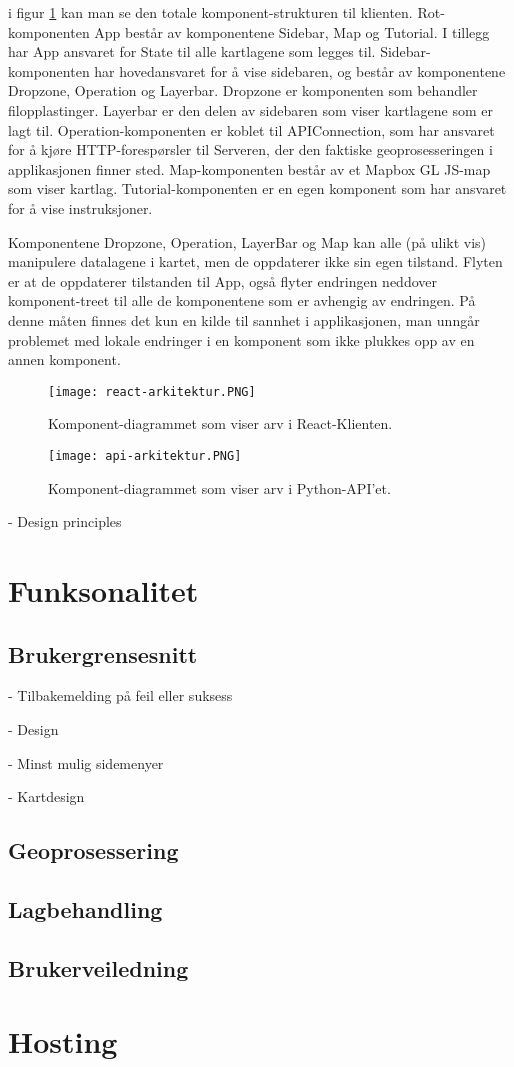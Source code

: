 i figur \ref{fig:react-arkitektur} kan man se den totale komponent-strukturen til klienten. Rot-komponenten App består av komponentene Sidebar, Map og Tutorial. I tillegg har App ansvaret for State til alle kartlagene som legges til. Sidebar-komponenten har hovedansvaret for å vise sidebaren, og består av komponentene Dropzone, Operation og Layerbar. Dropzone er komponenten som behandler filopplastinger. Layerbar er den delen av sidebaren som viser kartlagene som er lagt til. Operation-komponenten er koblet til APIConnection, som har ansvaret for å kjøre HTTP-forespørsler til Serveren, der den faktiske geoprosesseringen i applikasjonen finner sted. Map-komponenten består av et Mapbox GL JS-map som viser kartlag. Tutorial-komponenten er en egen komponent som har ansvaret for å vise instruksjoner. 

Komponentene Dropzone, Operation, LayerBar og Map kan alle (på ulikt vis) manipulere datalagene i kartet, men de oppdaterer ikke sin egen tilstand. Flyten er at de oppdaterer tilstanden til App, også flyter endringen neddover komponent-treet til alle de komponentene som er avhengig av endringen. På denne måten finnes det kun en kilde til sannhet i applikasjonen, man unngår problemet med lokale endringer i en komponent som ikke plukkes opp av en annen komponent.  

\begin{figure}[h]
    \center
    \texttt{[image: react-arkitektur.PNG]}
    \caption{Komponent-diagrammet som viser arv i React-Klienten.}
    \label{fig:react-arkitektur}
\end{figure}



\begin{figure}[h]
    \center
    \texttt{[image: api-arkitektur.PNG]}
    \caption{Komponent-diagrammet som viser arv i Python-API'et.}
    \label{fig:firstping}
\end{figure}


- Design principles

\section{Funksonalitet}

\subsection{Brukergrensesnitt}

- Tilbakemelding på feil eller suksess

- Design

- Minst mulig sidemenyer

- Kartdesign

\subsection{Geoprosessering}

\subsection{Lagbehandling}

\subsection{Brukerveiledning}

\section{Hosting}
\label{sec:hosting}
